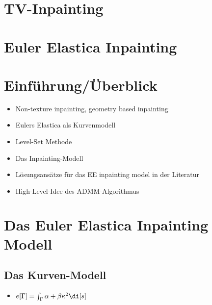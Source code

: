 \documentclass{mythesis}
\begin{document}
\section{TV-Inpainting}

\section{Euler Elastica Inpainting}














\section{Einführung/Überblick}

\begin{itemize}
    \item
	Non-texture inpainting, geometry based inpainting
    \item
	Eulers Elastica als Kurvenmodell
    \item
	Level-Set Methode
    \item
	Das Inpainting-Modell
    \item
	Lösungsansätze für das EE inpainting model in der Literatur
    \item
	High-Level-Idee des ADMM-Algorithmus
\end{itemize}

\section{Das Euler Elastica Inpainting Modell}

\subsection{Das Kurven-Modell}

\begin{itemize}
    \item
	$e[\Gamma] = \int_\Gamma \alpha + \beta \kappa^2 \di[s]$
\end{itemize}
\end{document}
